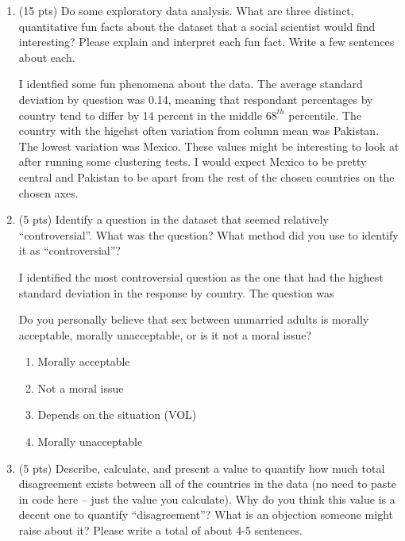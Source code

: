 \documentclass{article}
\begin{document}
\begin{enumerate}[label=(\alph*)]

    \item (15 pts) Do some exploratory data analysis. What are three distinct, quantitative fun facts about the dataset that a social scientist would find interesting? Please explain and interpret each fun fact. Write a few sentences about each. 

    \bigskip

    \begin{mdframed}
        I identfied some fun phenomena about the data. The average standard deviation by question was 0.14, meaning that respondant percentages by country tend to differ 
        by 14 percent in the middle $68^{th}$ percentile. The country with the higehst often variation from column mean was Pakistan. The lowest variation was Mexico.
        These values might be interesting to look at after running some clustering tests. I would expect Mexico to be pretty central and Pakistan to be apart from the rest of the chosen countries on the chosen axes.
    \end{mdframed}

    \item (5 pts) Identify a question in the dataset that seemed relatively ``controversial''. What was the question? What method did you use to identify it as ``controversial''? 

    \bigskip

    \begin{mdframed}
        I identified the most controversial question as the one that had the highest standard deviation in the response by country.
        The question was 
        
        Do you personally believe that sex between unmarried adults is morally acceptable, morally unacceptable, or is it not a moral issue? 
        \begin{enumerate}
            \item Morally acceptable
            \item Not a moral issue
            \item Depends on the situation (VOL)
            \item Morally unacceptable
        \end{enumerate}
    \end{mdframed}

    \item (5 pts) Describe, calculate, and present a value to quantify how much total disagreement exists between all of the countries in the data (no need to paste in code here -- just the value you calculate). Why do you think this value is a decent one to quantify ``disagreement''? What is an objection someone might raise about it? Please write a total of about 4-5 sentences. 


\end{enumerate}
\end{document}
